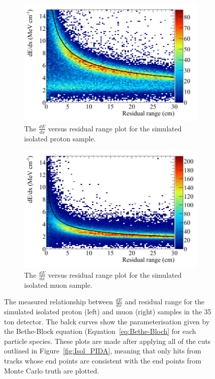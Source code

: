 \begin{figure}
  \centering
  \begin{subfigure}{0.48\textwidth}
        \centering
        \includegraphics[width=\textwidth]{IsolatedProtons_500V_Dec16_Proton_dEdx}
        \caption{The $\frac{dE}{dx}$ versus residual range plot for the simulated isolated proton sample.}
        \label{fig:Isol_dEdx_Proton}
  \end{subfigure}%
  \hspace{0.03\textwidth}%
  \begin{subfigure}{0.48\textwidth}
        \centering
        \includegraphics[width=\textwidth]{IsolatedMuons_500V_Dec16_Muon_dEdx}
        \caption{The $\frac{dE}{dx}$ versus residual range plot for the simulated isolated muon sample.}
        \label{fig:Isol_dEdx_Muon}
  \end{subfigure}
  \caption[The $\frac{dE}{dx}$ versus residual range plot for the simulated isolated proton and muon samples in the 35 ton detector.]
          {The measured relationship between $\frac{dE}{dx}$ and residual range for the simulated isolated proton (left) and muon (right) samples in the 35 ton detector. The balck curves show the parameterisation given by the Bethe-Block equation (Equation~\ref{eq:Bethe-Bloch} for each particle species. These plots are made after applying all of the cuts outlined in Figure~\ref{fig:Isol_PIDA}, meaning that only hits from tracks whose end points are consistent with the end points from Monte Carlo truth are plotted.}
  \label{fig:Isol_dEdx}
\end{figure}

